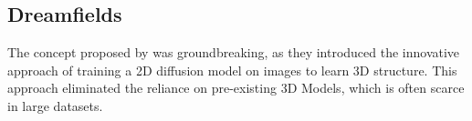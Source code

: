 \subsection{Dreamfields}
\label{dreamfields}

The concept proposed by \citeauthor{jainDreamFields} was groundbreaking, as they introduced the innovative approach of training a 2D diffusion model on images to learn 3D structure. This approach eliminated the reliance on pre-existing 3D Models, which is often scarce in large datasets.